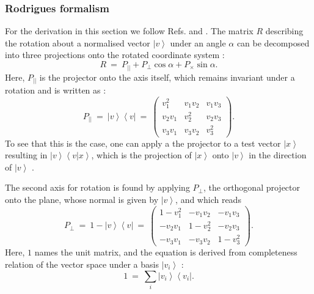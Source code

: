 \subsubsection{Rodrigues formalism}
For the derivation in this section we follow Refs. \cite[p. 718, p. 816]{Arens2015} and \cite{wiki_rodrigues}.
The matrix $R$ describing the rotation about a normalised vector $\left|v\right>$ under an angle $\alpha$ can be decomposed into
three projections onto the rotated coordinate system \cite[p. 718, p. 816]{Arens2015}:
\begin{equation}
	\boxed{R \ = \ P_{||} + P_{\perp} \cos \alpha + P_{\times} \sin \alpha.}
	\label{eq:rodrigues}
\end{equation}
Here, $P_{||}$ is the projector onto the axis itself, which remains invariant under a rotation and is written as \cite[p. 814]{Arens2015}:
\begin{equation}
	P_{||} \ =\ \left|v\right> \left<v\right| \ =\ 
		\left( \begin{array}{ccc} 
			v_1^2    &    v_1 v_2 &       v_1 v_3 \\
			v_2 v_1 &       v_2^2 &       v_2 v_3 \\
			v_3 v_1 &    v_3 v_2 &          v_3^2
		\end{array} \right).
\end{equation}
To see that this is the case, one can apply a the projector to a test vector $\left| x \right>$ resulting in $\left|v\right> \left<v | x \right>$,
which is the projection of $\left| x \right>$ onto $\left| v \right>$ in the direction of $\left| v \right>$ \cite[p. 814]{Arens2015}.

The second axis for rotation is found by applying $P_{\perp}$, the orthogonal projector onto the plane, 
whose normal is given by $\left|v\right>$, and which reads \cite[p. 814]{Arens2015}
\begin{equation}
	P_{\perp} \ =\ 1 - \left|v\right> \left<v\right| \ =\ 
		\left( \begin{array}{ccc} 
			1 - v_1^2    &      - v_1 v_2 &         - v_1 v_3 \\
			   - v_2 v_1 &      1 - v_2^2 &         - v_2 v_3 \\
			   - v_3 v_1 &      - v_3 v_2 &         1 - v_3^2
		\end{array} \right).
\end{equation}
Here, $1$ names the unit matrix, and the equation is derived from completeness relation of the vector space under
a basis $\left| v_i \right>$ \cite[p. 814]{Arens2015}:
\begin{equation}
	1 \ =\  \sum_i \left| v_i \right> \left< v_i \right|.
\end{equation}

